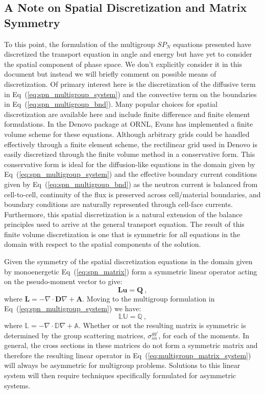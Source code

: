\documentclass[letterpaper,12pt]{article}
\begin{document}
\subsection{A Note on Spatial Discretization and Matrix Symmetry}
\label{subsec:spatial_discretization}
To this point, the formulation of the multigroup $SP_N$ equations
presented have discretized the transport equation in angle and energy
but have yet to consider the spatial component of phase space. We
don't explicitly consider it in this document but instead we will
briefly comment on possible means of discretization. Of primary
interest here is the discretization of the diffusive term in
Eq~(\ref{eq:spn_multigroup_system}) and the convective term on the
boundaries in Eq~(\ref{eq:spn_multigroup_bnd}). Many popular choices
for spatial discretization are available here and include finite
difference and finite element formulations. In the Denovo package at
ORNL, Evans has implemented a finite volume scheme for these
equations. Although arbitrary grids could be handled effectively
through a finite element scheme, the rectilinear grid used in Denovo
is easily discretized through the finite volume method in a
conservative form. This conservative form is ideal for the
diffusion-like equations in the domain given by
Eq~(\ref{eq:spn_multigroup_system}) and the effective boundary current
conditions given by Eq~(\ref{eq:spn_multigroup_bnd}) as the neutron
current is balanced from cell-to-cell, continuity of the flux is
preserved across cell/material boundaries, and boundary conditions are
naturally represented through cell-face currents. Furthermore, this
spatial discretization is a natural extension of the balance
principles used to arrive at the general transport equation. The
result of this finite volume discretization is one that is symmetric
for all equations in the domain with respect to the spatial components
of the solution.

Given the symmetry of the spatial discretization equations in the
domain given by monoenergetic Eq~(\ref{eq:spn_matrix}) form a
symmetric linear operator acting on the pseudo-moment vector to give:
\begin{equation}
  \mathbf{L}\mathbf{u}=\mathbf{Q}\:,
  \label{eq:matrix_system}
\end{equation}
where $\mathbf{L} = -\nabla \cdot \mathbf{D} \nabla +
\mathbf{A}$. Moving to the multigroup formulation in
Eq~(\ref{eq:spn_multigroup_system}) we have:
\begin{equation}
  \mathbb{L}\mathbb{U}=\mathbb{Q}\:,
  \label{eq:multigroup_matrix_system}
\end{equation}
where $\mathbb{L} = -\nabla \cdot \mathbb{D} \nabla +
\mathbb{A}$. Whether or not the resulting matrix is symmetric is
determined by the group scattering matrices, $\sigma_{sn}^{gg'}$, for
each of the moments. In general, the cross sections in these matrices
do not form a symmetric matrix and therefore the resulting linear
operator in Eq~(\ref{eq:multigroup_matrix_system}) will always be
asymmetric for multigroup problems. Solutions to this linear system
will then require techniques specifically formulated for asymmetric
systems.
\end{document}
